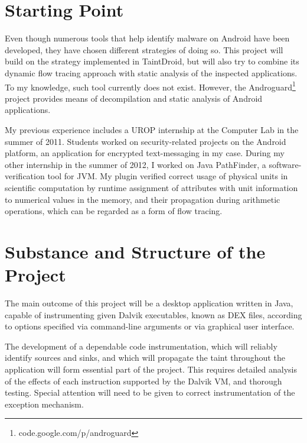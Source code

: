 \documentclass[12pt]{article}
\begin{document}
\section*{Starting Point}

Even though numerous tools that help identify malware on Android have been 
developed, they have chosen different strategies of doing so. This project
will build on the strategy implemented in TaintDroid, but will also try to 
combine its dynamic flow tracing approach with static analysis of the 
inspected applications. To my knowledge, such tool currently does not exist.
However, the Androguard\footnote{code.google.com/p/androguard} project provides
means of decompilation and static analysis of Android applications.

My previous experience includes a UROP internship at the Computer Lab
in the summer of 2011. Students worked on security-related projects on
the Android platform, an application for encrypted text-messaging in my
case. During my other internship in the summer of 2012, I worked on Java PathFinder,
a software-verification tool for JVM. My plugin verified correct usage of 
physical units in scientific computation by runtime assignment of attributes 
with unit information to numerical values in the memory, and their propagation 
during arithmetic operations, which can be regarded as a form of flow tracing. 

\section*{Substance and Structure of the Project}

The main outcome of this project will be a desktop application written 
in Java, capable of instrumenting given Dalvik executables, known as DEX
files, according to options specified via command-line arguments or via
graphical user interface.


The development of a dependable code instrumentation, which will reliably 
identify sources and sinks, and which will propagate the taint throughout 
the application will form essential part of the project. This requires 
detailed analysis of the effects of each instruction supported by the 
Dalvik VM, and thorough testing. Special attention will need to be given 
to correct instrumentation of the exception mechanism.
\end{document}

